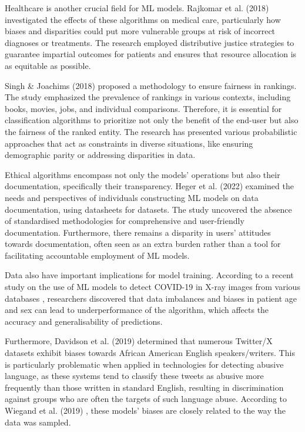 \documentclass[fleqn,10pt]{wlscirep}
\begin{document}
Healthcare is another crucial field for ML models. Rajkomar et al. (2018)\cite{Rajkomar2018} investigated the effects of these algorithms on medical care, particularly how biases and disparities could put more vulnerable groups at risk of incorrect diagnoses or treatments. The research employed distributive justice strategies to guarantee impartial outcomes for patients and ensures that resource allocation is as equitable as possible.

Singh \& Joachims (2018) \cite{10.1145/3219819.3220088} proposed a methodology to ensure fairness in rankings. The study emphasized the prevalence of rankings in various contexts, including books, movies, jobs, and individual comparisons. Therefore, it is essential for classification algorithms to prioritize not only the benefit of the end-user but also the fairness of the ranked entity. The research has presented various probabilistic approaches that act as constraints in diverse situations, like ensuring demographic parity or addressing disparities in data.

Ethical algorithms encompass not only the models' operations but also their documentation, specifically their transparency. Heger et al. (2022)\cite{https://doi.org/10.48550/arxiv.2206.02923} examined the needs and perspectives of individuals constructing ML models on data documentation, using datasheets for datasets. The study uncovered the absence of standardised methodologies for comprehensive and user-friendly documentation. Furthermore, there remains a disparity in users' attitudes towards documentation, often seen as an extra burden rather than a tool for facilitating accountable employment of ML models.

Data also have important implications for model training. According to a recent study on the use of ML models to detect COVID-19 in X-ray images from various databases \cite{Arias-Garzón2023}, researchers discovered that data imbalances and biases in patient age and sex can lead to underperformance of the algorithm, which affects the accuracy and generalisability of predictions.

Furthermore, Davidson et al. (2019) \cite{davidson2019racial} determined that numerous Twitter/X datasets exhibit biases towards African American English speakers/writers. This is particularly problematic when applied in technologies for detecting abusive language, as these systems tend to classify these tweets as abusive more frequently than those written in standard English, resulting in discrimination against groups who are often the targets of such language abuse. According to Wiegand et al. (2019) \cite{wiegand-etal-2019-detection}, these models' biases are closely related to the way the data was sampled. 
\end{document}
